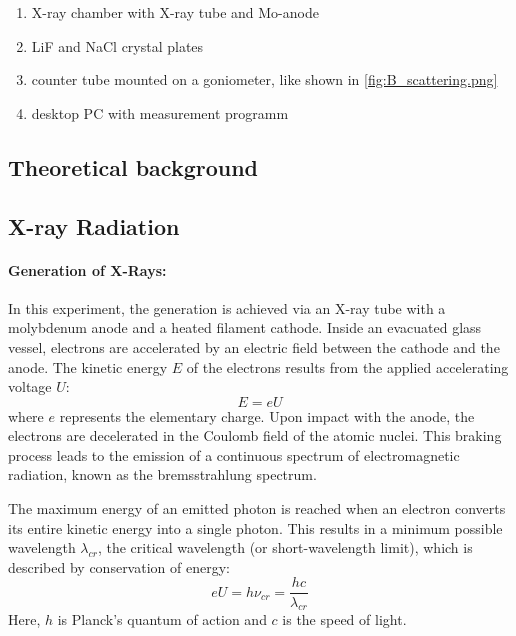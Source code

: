 \begin{enumerate}
    \item X-ray chamber with X-ray tube and Mo-anode
    \item LiF and NaCl crystal plates
    \item counter tube mounted on a goniometer, like shown in \cref{fig:B_scattering.png}
    \item desktop PC with measurement programm
\end{enumerate}

\clearpage

\subsection[Theoretical background]{Theoretical background \protect\autocite{Skript_2.2}}
\subsection{X-ray Radiation}
\paragraph{Generation of X-Rays:} In this experiment, the generation is achieved via an X-ray tube with a molybdenum anode and a heated filament cathode. Inside an evacuated glass vessel, electrons are accelerated by an electric field between the cathode and the anode. The kinetic energy \(E\) of the electrons results from the applied accelerating voltage \(U\):
\begin{equation} \label{eq:energie}
    E = e U
\end{equation}
where \(e\) represents the elementary charge. 
Upon impact with the anode, the electrons are decelerated in the Coulomb field of the atomic nuclei. This braking process leads to the emission of a continuous spectrum of electromagnetic radiation, known as the bremsstrahlung spectrum.

The maximum energy of an emitted photon is reached when an electron converts its entire kinetic energy into a single photon. This results in a minimum possible wavelength \(\lambda_{cr}\), the critical wavelength (or short-wavelength limit), which is described by conservation of energy:
\begin{equation} \label{eq:grenzwelle}
    e U = h \nu_{cr} = \frac{hc}{\lambda_{cr}}
\end{equation}
Here, \(h\) is Planck's quantum of action and \(c\) is the speed of light. 

